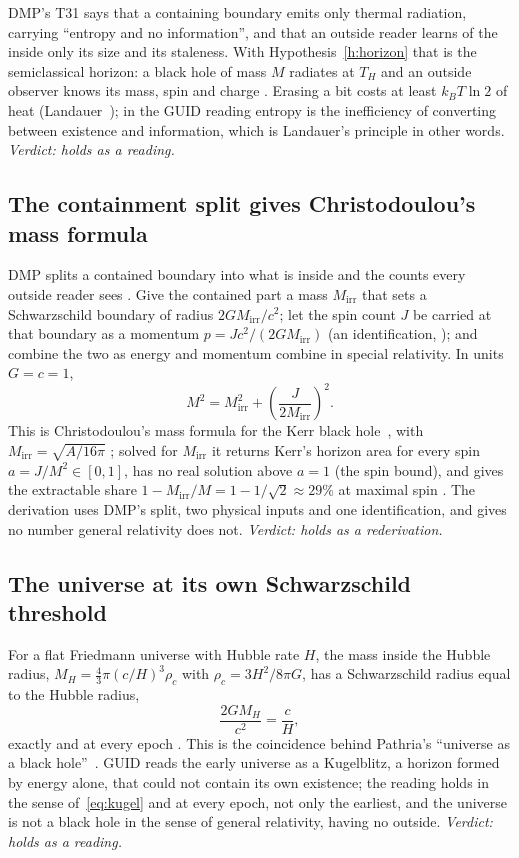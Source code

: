 DMP's T31 says that a containing boundary emits only thermal radiation, carrying ``entropy and no information'', and that an outside reader
learns of the inside only its size and its staleness. With Hypothesis~\ref{h:horizon} that is the semiclassical horizon: a black hole of mass
$M$ radiates at $T_H$ and an outside observer knows its mass, spin and charge \tagP. Erasing a bit costs at least $k_BT\ln2$ of heat
(Landauer~\cite{landauer}); in the GUID reading entropy is the inefficiency of converting between existence and information, which is
Landauer's principle in other words. \emph{Verdict: holds as a reading.}

\subsection{The containment split gives Christodoulou's mass formula}

DMP splits a contained boundary into what is inside and the counts every outside reader sees \tagD. Give the contained part a mass
$M_{\text{irr}}$ that sets a Schwarzschild boundary of radius $2GM_{\text{irr}}/c^2$; let the spin count $J$ be carried at that boundary as
a momentum $p=Jc^2/(2GM_{\text{irr}})$ (an identification, \tagH); and combine the two as energy and momentum combine in special relativity. In
units $G=c=1$,
\begin{equation}\label{eq:christo}
M^2=M_{\text{irr}}^2+\left(\frac{J}{2M_{\text{irr}}}\right)^2 .
\end{equation}
This is Christodoulou's mass formula for the Kerr black hole~\cite{christodoulou}, with $M_{\text{irr}}=\sqrt{A/16\pi}$ \tagP; solved for
$M_{\text{irr}}$ it returns Kerr's horizon area for every spin $a=J/M^2\in[0,1]$, has no real solution above $a=1$ (the spin bound), and
gives the extractable share $1-M_{\text{irr}}/M=1-1/\sqrt2\approx29\%$ at maximal spin . The derivation uses DMP's split, two
physical inputs and one identification, and gives no number general relativity does not. \emph{Verdict: holds as a rederivation.}

\subsection{The universe at its own Schwarzschild threshold}

For a flat Friedmann universe with Hubble rate $H$, the mass inside the Hubble radius, $M_H=\tfrac43\pi(c/H)^3\rho_c$ with
$\rho_c=3H^2/8\pi G$, has a Schwarzschild radius equal to the Hubble radius,
\begin{equation}\label{eq:kugel}
\frac{2GM_H}{c^2}=\frac cH ,
\end{equation}
exactly and at every epoch . This is the coincidence behind Pathria's ``universe as a black hole''~\cite{pathria}. GUID reads the
early universe as a Kugelblitz, a horizon formed by energy alone, that could not contain its own existence; the reading holds in the sense
of~\eqref{eq:kugel} and at every epoch, not only the earliest, and the universe is not a black hole in the sense of general relativity,
having no outside. \emph{Verdict: holds as a reading.}


